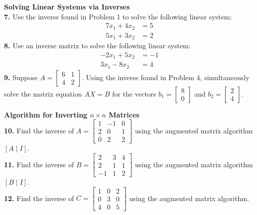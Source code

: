 \documentclass{article}
\begin{document}
\vspace{10pt}
\noindent
\textbf{Solving Linear Systems via Inverses} \\
\textbf{7.} Use the inverse found in Problem 1 to solve the following linear system:
\begin{align*}
7x_1 + 4x_2 &= 5 \\
5x_1 + 3x_2 &= 2
\end{align*}
\textbf{8.} Use an inverse matrix to solve the following linear system:
\begin{align*}
-2x_1 + 5x_2 &= -1 \\
3x_1 - 8x_2 &= 4
\end{align*}
\textbf{9.} Suppose $A = \begin{bmatrix} 6 & 1 \\ 4 & 2 \end{bmatrix}$. Using the inverse found in Problem 4, simultaneously solve the matrix equation $AX = B$ for the vectors $b_1 = \begin{bmatrix} 8 \\ 0 \end{bmatrix}$ and $b_2 = \begin{bmatrix} 2 \\ 4 \end{bmatrix}$. 

\vspace{10pt}
\noindent
\textbf{Algorithm for Inverting $n \times n$ Matrices} \\
\textbf{10.} Find the inverse of $A = \begin{bmatrix} 1 & -1 & 0 \\ 2 & 0 & 1 \\ 0 & 2 & 2 \end{bmatrix}$ using the augmented matrix algorithm $[A \mid I]$. \\
\textbf{11.} Find the inverse of $B = \begin{bmatrix} 2 & 3 & 4 \\ 2 & 1 & 1 \\ -1 & 1 & 2 \end{bmatrix}$ using the augmented matrix algorithm $[B \mid I]$. \\
\textbf{12.} Find the inverse of $C = \begin{bmatrix} 1 & 0 & 2 \\ 0 & 3 & 0 \\ 4 & 0 & 5 \end{bmatrix}$ using the augmented matrix algorithm. 
\end{document}
